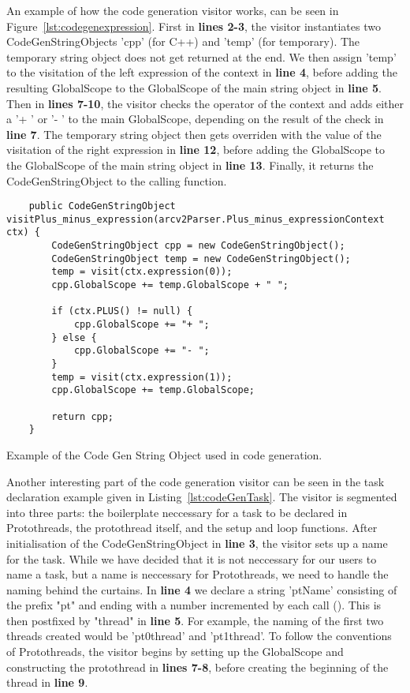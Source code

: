 An example of how the code generation visitor works, can be seen in Figure~\ref{lst:codegenexpression}. First in \textbf{lines 2-3}, the visitor instantiates two CodeGenStringObjects 'cpp' (for C++) and 'temp' (for temporary). The temporary string object does not get returned at the end. We then assign 'temp' to the visitation of the left expression of the context in \textbf{line 4}, before adding the resulting GlobalScope to the GlobalScope of the main string object in \textbf{line 5}. Then in \textbf{lines 7-10}, the visitor checks the operator of the context and adds either a '+ ' or '- ' to the main GlobalScope, depending on the result of the check in \textbf{line 7}. The temporary string object then gets overriden with the value of the visitation of the right expression in \textbf{line 12}, before adding the GlobalScope to the GlobalScope of the main string object in \textbf{line 13}. Finally, it returns the CodeGenStringObject to the calling function.

\begin{listing}[htb!]
    \begin{verbatim}
    public CodeGenStringObject visitPlus_minus_expression(arcv2Parser.Plus_minus_expressionContext ctx) {
        CodeGenStringObject cpp = new CodeGenStringObject();
        CodeGenStringObject temp = new CodeGenStringObject();
        temp = visit(ctx.expression(0));
        cpp.GlobalScope += temp.GlobalScope + " ";

        if (ctx.PLUS() != null) {
            cpp.GlobalScope += "+ ";
        } else {
            cpp.GlobalScope += "- ";
        }
        temp = visit(ctx.expression(1));
        cpp.GlobalScope += temp.GlobalScope;

        return cpp;
    }
    \end{verbatim}
    \caption{Example of the Code Gen String Object used in code generation.}
    \label{lst:codegenexpression}
\end{listing}

Another interesting part of the code generation visitor can be seen in the task declaration example given in Listing~\ref{lst:codeGenTask}. The visitor is segmented into three parts: the boilerplate neccessary for a task to be declared in Protothreads, the protothread itself, and the setup and loop functions. After initialisation of the CodeGenStringObject in \textbf{line 3}, the visitor sets up a name for the task. While we have decided that it is not neccessary for our users to name a task, but a name is neccessary for Protothreads, we need to handle the naming behind the curtains. In \textbf{line 4} we declare a string 'ptName' consisting of the prefix "pt" and ending with a number incremented by each call (). This is then postfixed by "thread" in \textbf{line 5}. For example, the naming of the first two threads created would be 'pt0thread' and 'pt1thread'. To follow the conventions of Protothreads, the visitor begins by setting up the GlobalScope and constructing the protothread in \textbf{lines 7-8}, before creating the beginning of the thread in \textbf{line 9}.

